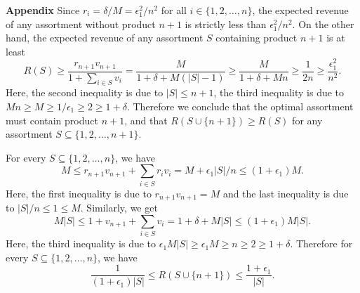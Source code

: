 \documentclass[msom,non-blindrev]{informs3} %
\theoremstyle{definition}
\begin{document}
\begin{appendices}{\Large \noindent\textbf{Appendix}}
    Since $r_i=\delta/M=\epsilon_1^2/n^2$ for all $i\in\{1,2,\dots,n\}$, the expected revenue of any assortment without product $n+1$ is strictly less than $\epsilon_1^2/n^2$. On the other hand, the expected revenue of any assortment $S$ containing product $n+1$ is at least
    \begin{equation*}
    R(S) \geq \dfrac{r_{n+1}v_{n+1}}{1+\sum_{i\in S} v_i} = \frac{M}{1+\delta + M (|S|-1)}  \geq\dfrac{M}{1+\delta+Mn}\geq\dfrac{1}{2n}\geq\dfrac{\epsilon_1^2}{n^2}.
    \end{equation*}
    Here, the second inequality is due to $|S|\leq n+1$, the third inequality is due to $Mn\geq M\geq 1/\epsilon_1\geq 2\geq 1+\delta$. Therefore we conclude that the optimal assortment must contain product $n+1$, and that $R(S\cup\{n+1\})\geq R(S)$ for any assortment $S\subseteq\{1,2,\dots,n+1\}$.
				
	For every $S\subseteq\{1,2,\dots,n\}$, we have
	\begin{equation*}
	M\leq r_{n+1}v_{n+1}+\sum_{i\in S}r_iv_i=M+\epsilon_1|S|/n\leq (1+\epsilon_1)M.
	\end{equation*}
    Here, the first inequality is due to $r_{n+1}v_{n+1}=M$ and the last inequality is due to $|S|/n\leq 1\leq M$. Similarly, we get
    \begin{equation*}
    M|S|\leq 1+v_{n+1}+\sum_{i\in S}v_i=1+\delta+M|S|\leq (1+\epsilon_1)M|S|.
    \end{equation*}
Here, the third inequality is due to $\epsilon_1M|S|\geq \epsilon_1M\geq n\geq 2\geq 1+\delta$.
	Therefore for every $S\subseteq\{1,2,\dots,n\}$, we have
	\begin{equation}
		\dfrac{1}{(1+\epsilon_1)|S|}\leq R(S\cup\{n+1\})\leq\dfrac{1+\epsilon_1}{|S|}.\label{eq:revenue_versus_cover}
	\end{equation}


\end{appendices}
\end{document}
